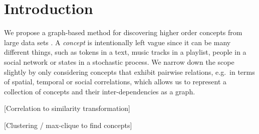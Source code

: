 \documentclass{sig-alternate}
\begin{document}


\section{Introduction}

We propose a graph-based method for discovering higher order concepts from large data
sets \cite{gornerup-2015}. A \emph{concept} is intentionally left vague since it can be many different things, such as tokens in a text,
music tracks in a playlist, people in a social network or states in a stochastic process. We narrow down the scope
slightly by only considering concepts that exhibit pairwise relations, e.g.\ in terms of spatial, temporal or social
correlations, which allows us to represent a collection of concepts and their inter-dependencies as a graph.

[Correlation to similarity transformation]

[Clustering / max-clique to find concepts]
\end{document}
